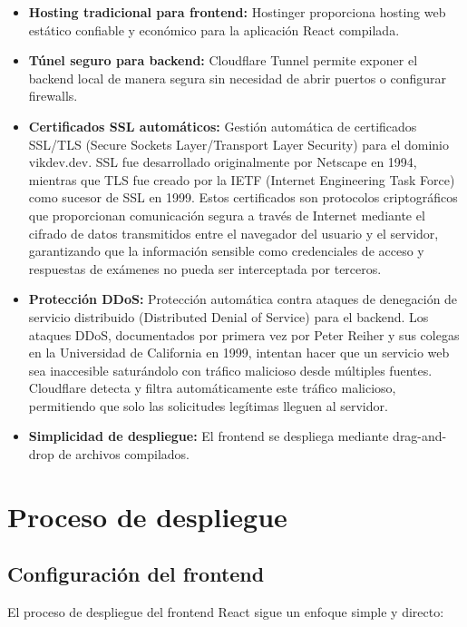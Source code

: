 \documentclass[12pt,a4paper]{report}
\begin{document}
\begin{itemize}
\item \textbf{Hosting tradicional para frontend:} Hostinger proporciona hosting web estático confiable y económico para la aplicación React compilada.
\item \textbf{Túnel seguro para backend:} Cloudflare Tunnel permite exponer el backend local de manera segura sin necesidad de abrir puertos o configurar firewalls.
\item \textbf{Certificados SSL automáticos:} Gestión automática de certificados SSL/TLS (Secure Sockets Layer/Transport Layer Security) para el dominio vikdev.dev. SSL fue desarrollado originalmente por Netscape en 1994, mientras que TLS fue creado por la IETF (Internet Engineering Task Force) como sucesor de SSL en 1999. Estos certificados son protocolos criptográficos que proporcionan comunicación segura a través de Internet mediante el cifrado de datos transmitidos entre el navegador del usuario y el servidor, garantizando que la información sensible como credenciales de acceso y respuestas de exámenes no pueda ser interceptada por terceros.
\item \textbf{Protección DDoS:} Protección automática contra ataques de denegación de servicio distribuido (Distributed Denial of Service) para el backend. Los ataques DDoS, documentados por primera vez por Peter Reiher y sus colegas en la Universidad de California en 1999, intentan hacer que un servicio web sea inaccesible saturándolo con tráfico malicioso desde múltiples fuentes. Cloudflare detecta y filtra automáticamente este tráfico malicioso, permitiendo que solo las solicitudes legítimas lleguen al servidor.
\item \textbf{Simplicidad de despliegue:} El frontend se despliega mediante drag-and-drop de archivos compilados.
\end{itemize}

\section{Proceso de despliegue}

\subsection{Configuración del frontend}

El proceso de despliegue del frontend React sigue un enfoque simple y directo:
\end{document}
